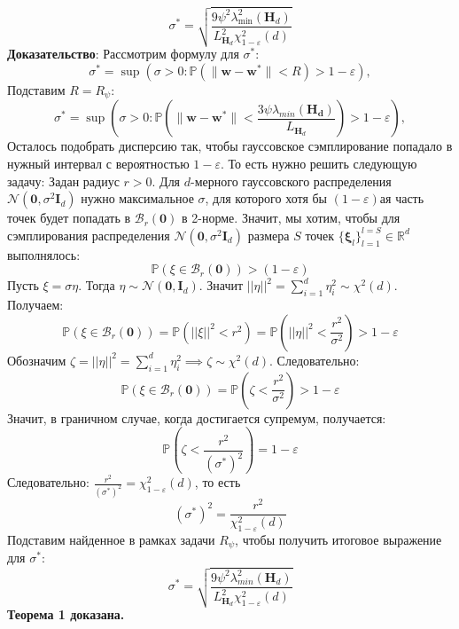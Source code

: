 \documentclass[11pt,a4paper]{article}
\begin{document}
$$\sigma^{*} =
\sqrt{\frac{9 \psi^2 \lambda_{\min}^2(\mathbf{H}_d)}{{L}_{\mathbf{H}_d}^2 \chi^2_{1-\varepsilon}(d)}}$$
\textbf{Доказательство}:\newline
Рассмотрим формулу для $\sigma^*$:\newline
$$\sigma^* = \sup (\sigma > 0 :\mathbb{P}\left(\|\mathbf{w}-\mathbf{w}^*\| < R\right) > 1-\varepsilon),$$
Подставим $R = R_{\psi}$:
$$\sigma^* = \sup (\sigma > 0 :\mathbb{P}\!\left(\|\mathbf{w}-\mathbf{w}^*\| < \frac{3\psi \lambda_{min}(\mathbf{H_d})}{L_{\mathbf{H}_d}}\right) > 1-\varepsilon),$$
Осталось подобрать дисперсию так, чтобы гауссовское сэмплирование попадало в нужный интервал с вероятностью $1-\varepsilon$. \newline
То есть нужно решить следующую задачу:\newline
Задан радиус $r > 0$. \newline
Для $d$-мерного гауссовского распределения $\mathcal{N}(\mathbf{0}, \sigma^2 \mathbf{I}_d)$ нужно максимальное $\sigma$, для которого хотя бы $(1-\varepsilon)$ая часть точек будет попадать в $\mathcal{B}_r(\mathbf{0})$ в 2-норме. \newline
Значит, мы хотим, чтобы для сэмплирования распределения $\mathcal{N}(\mathbf{0}, \sigma^2 \mathbf{I}_d)$ размера $S$ точек $\{\mathbf{\xi}_l\}^{l=S}_{l=1}\in\mathbb{R}^d$ выполнялось:
$$\mathbb{P} ( \xi\in\mathcal{B}_r(\mathbf{0}) ) > (1-\varepsilon)$$
Пусть $\xi = \sigma \eta$. \newline
Тогда $\eta \sim \mathcal{N}(\mathbf{0}, \mathbf{I}_d)$. Значит $||\eta||^2= \displaystyle \sum_{i=1}^d \eta_i^2 \sim \chi^2(d)$. \newline
Получаем:
$$\mathbb{P}\left(\xi\in\mathcal{B}_r(\mathbf{0})\right) = \mathbb{P}\left(||\xi||^2 < r^2\right) = \mathbb{P}\left(||\eta||^2 < \frac{r^2}{\sigma^2}\right) > 1 - \varepsilon$$
Обозначим $\zeta =||\eta||^2= \displaystyle \sum_{i=1}^d \eta_i^2 \implies \zeta \sim \chi^2(d).$ Следовательно:
$$\mathbb{P}\left(\xi\in\mathcal{B}_r(\mathbf{0})\right)=\mathbb{P}\left(\zeta < \frac{r^2}{\sigma^2}\right) > 1-\varepsilon$$
Значит, в граничном случае, когда достигается супремум, получается:
$$\mathbb{P}\left(\zeta < \frac{r^2}{(\sigma^*)^2}\right) = 1-\varepsilon$$
Следовательно:
$\frac{r^2}{(\sigma^*)^2} = \chi^2_{1-\varepsilon}(d)$, то есть 
$$(\sigma^*)^2=\frac{r^2}{\chi^2_{1-\varepsilon}(d)}$$
Подставим найденное в рамках задачи $R_{\psi}$, чтобы получить итоговое выражение для $\sigma^*$:
$$\sigma^* = \sqrt{\frac{9\psi^2 \lambda_{min}^2(\mathbf{H}_d)}{L_{\mathbf{H}_d}^2\chi^2_{1-\varepsilon}(d)}}$$
\textbf{Теорема 1 доказана.}
    
\end{document}
